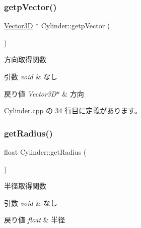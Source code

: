 \mbox{\label{class_cylinder_a81a0ee46547b6c2e4e10fc821389f377}} 
\subsubsection{\texorpdfstring{getp\+Vector()}{getpVector()}}
{\footnotesize\ttfamily \mbox{\hyperlink{class_vector3_d}{Vector3D}} $\ast$ Cylinder\+::getp\+Vector (\begin{DoxyParamCaption}{ }\end{DoxyParamCaption})}



方向取得関数 


\begin{DoxyParams}{引数}
{\em void} & なし \\
\hline
\end{DoxyParams}

\begin{DoxyRetVals}{戻り値}
{\em Vector3\+D$\ast$} & 方向 \\
\hline
\end{DoxyRetVals}


 Cylinder.\+cpp の 34 行目に定義があります。

\mbox{\label{class_cylinder_a54bd26ac60e885bdca9a101fcc998711}} 
\subsubsection{\texorpdfstring{get\+Radius()}{getRadius()}}
{\footnotesize\ttfamily float Cylinder\+::get\+Radius (\begin{DoxyParamCaption}{ }\end{DoxyParamCaption})}



半径取得関数 


\begin{DoxyParams}{引数}
{\em void} & なし \\
\hline
\end{DoxyParams}

\begin{DoxyRetVals}{戻り値}
{\em float} & 半径 \\
\hline
\end{DoxyRetVals}


